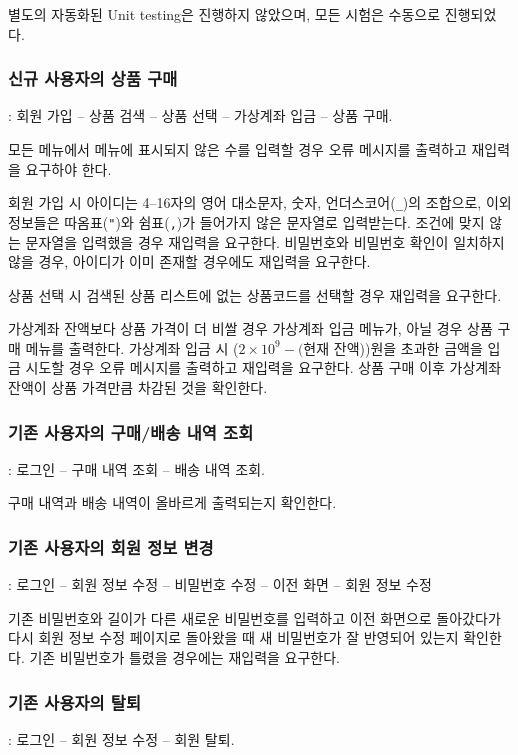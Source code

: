 \documentclass[runningheads]{llncs}
\begin{document}
별도의 자동화된 Unit testing은 진행하지 않았으며, 모든 시험은 수동으로 진행되었다.

\subsubsection{신규 사용자의 상품 구매}: 회원 가입 -- 상품 검색 -- 상품 선택 -- 가상계좌 입금 -- 상품 구매.

모든 메뉴에서 메뉴에 표시되지 않은 수를 입력할 경우 오류 메시지를 출력하고 재입력을 요구하야 한다.

회원 가입 시 아이디는 4--16자의 영어 대소문자, 숫자, 언더스코어(\texttt{_})의 조합으로, 이외 정보들은 따옴표(\texttt{"})와 쉼표(\texttt{,})가 들어가지 않은 문자열로 입력받는다. 조건에 맞지 않는 문자열을 입력했을 경우 재입력을 요구한다. 비밀번호와 비밀번호 확인이 일치하지 않을 경우, 아이디가 이미 존재할 경우에도 재입력을 요구한다.

상품 선택 시 검색된 상품 리스트에 없는 상품코드를 선택할 경우 재입력을 요구한다.

가상계좌 잔액보다 상품 가격이 더 비쌀 경우 가상계좌 입금 메뉴가, 아닐 경우 상품 구매 메뉴를 출력한다. 가상계좌 입금 시 ($2\times {10}^{9} - ($현재 잔액))원을 초과한 금액을 입금 시도할 경우 오류 메시지를 출력하고 재입력을 요구한다. 상품 구매 이후 가상계좌 잔액이 상품 가격만큼 차감된 것을 확인한다.

\subsubsection{기존 사용자의 구매/배송 내역 조회}: 로그인 -- 구매 내역 조회 -- 배송 내역 조회.

구매 내역과 배송 내역이 올바르게 출력되는지 확인한다.

\subsubsection{기존 사용자의 회원 정보 변경}: 로그인 -- 회원 정보 수정 -- 비밀번호 수정 -- 이전 화면 -- 회원 정보 수정

기존 비밀번호와 길이가 다른 새로운 비밀번호를 입력하고 이전 화면으로 돌아갔다가 다시 회원 정보 수정 페이지로 돌아왔을 때 새 비밀번호가 잘 반영되어 있는지 확인한다. 기존 비밀번호가 틀렸을 경우에는 재입력을 요구한다.

\subsubsection{기존 사용자의 탈퇴}: 로그인 -- 회원 정보 수정 -- 회원 탈퇴.
\end{document}
